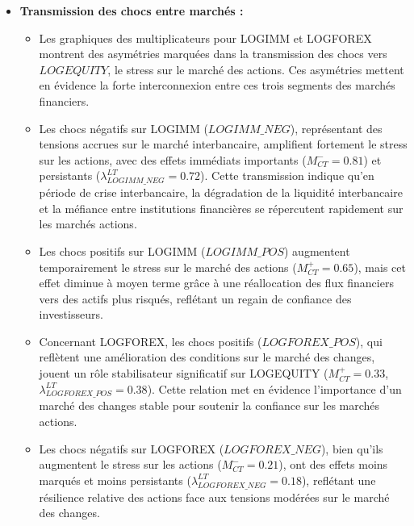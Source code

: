 \begin{itemize}
    \item \textbf{Transmission des chocs entre marchés :}
    \begin{itemize}
        \item Les graphiques des multiplicateurs pour LOGIMM et LOGFOREX montrent des asymétries marquées dans la transmission des chocs vers \(LOGEQUITY\), le stress sur le marché des actions. Ces asymétries mettent en évidence la forte interconnexion entre ces trois segments des marchés financiers.
        \item Les chocs négatifs sur LOGIMM (\(LOGIMM\_NEG\)), représentant des tensions accrues sur le marché interbancaire, amplifient fortement le stress sur les actions, avec des effets immédiats importants (\(M_{CT}^{-} = 0.81\)) et persistants (\(\lambda^{LT}_{LOGIMM\_NEG} = 0.72\)). Cette transmission indique qu’en période de crise interbancaire, la dégradation de la liquidité interbancaire et la méfiance entre institutions financières se répercutent rapidement sur les marchés actions.
        \item Les chocs positifs sur LOGIMM (\(LOGIMM\_POS\)) augmentent temporairement le stress sur le marché des actions (\(M_{CT}^{+} = 0.65\)), mais cet effet diminue à moyen terme grâce à une réallocation des flux financiers vers des actifs plus risqués, reflétant un regain de confiance des investisseurs.
        \item Concernant LOGFOREX, les chocs positifs (\(LOGFOREX\_POS\)), qui reflètent une amélioration des conditions sur le marché des changes, jouent un rôle stabilisateur significatif sur LOGEQUITY (\(M_{CT}^{+} = 0.33\), \(\lambda^{LT}_{LOGFOREX\_POS} = 0.38\)). Cette relation met en évidence l'importance d'un marché des changes stable pour soutenir la confiance sur les marchés actions.
        \item Les chocs négatifs sur LOGFOREX (\(LOGFOREX\_NEG\)), bien qu’ils augmentent le stress sur les actions (\(M_{CT}^{-} = 0.21\)), ont des effets moins marqués et moins persistants (\(\lambda^{LT}_{LOGFOREX\_NEG} = 0.18\)), reflétant une résilience relative des actions face aux tensions modérées sur le marché des changes.
    \end{itemize}


\end{itemize}
